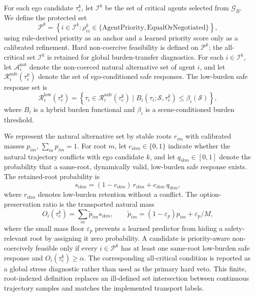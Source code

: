 \documentclass[10pt]{article}
\begin{document}
For each ego candidate $\tau^k_e$, let $\mathcal{I}^k$ be the set of critical agents selected from $\mathcal{G}_B$. We define the protected set
\begin{equation}
    \mathcal{P}^k
    =
    \left\{i\in\mathcal{I}^k:
    \rho^k_{ei}\in\{\mathrm{AgentPriority},\mathrm{EqualOrNegotiated}\}
    \right\},
    \label{eq:protected_set}
\end{equation}
using rule-derived priority as an anchor and a learned priority score only as a calibrated refinement. Hard non-coercive feasibility is defined on $\mathcal{P}^k$; the all-critical set $\mathcal{I}^k$ is retained for global burden-transfer diagnostics. For each $i\in\mathcal{I}^k$, let $\mathcal{A}^{\mathrm{nat}}_i$ denote the non-coerced natural alternative set of agent $i$, and let $\mathcal{R}^{\mathrm{safe}}_i(\tau^k_e)$ denote the set of ego-conditioned safe responses. The low-burden safe response set is
\begin{equation}
    \mathcal{R}^{\mathrm{low}}_i(\tau^k_e)
    =
    \left\{
    \tau_i \in \mathcal{R}^{\mathrm{safe}}_i(\tau^k_e)
    \mid
    B_i(\tau_i;\mathcal{S},\tau^k_e)
    \le
    \beta_i(\mathcal{S})
    \right\},
\end{equation}
where $B_i$ is a hybrid burden functional and $\beta_i$ is a scene-conditioned burden threshold.

We represent the natural alternative set by stable roots $r_{im}$ with calibrated masses $p_{im}$, $\sum_m p_{im}=1$. For root $m$, let $c_{ikm}\in\{0,1\}$ indicate whether the natural trajectory conflicts with ego candidate $k$, and let $q_{ikm}\in[0,1]$ denote the probability that a same-root, dynamically valid, low-burden safe response exists. The retained-root probability is
\begin{equation}
    s_{ikm}=(1-c_{ikm})\,r_{ikm}+c_{ikm}\,q_{ikm},
\end{equation}
where $r_{ikm}$ denotes low-burden retention without a conflict. The option-preservation ratio is the transported natural mass
\begin{equation}
    O_i(\tau^k_e)=\sum_m \widetilde p_{im}s_{ikm},
    \qquad
    \widetilde p_{im}=(1-\varepsilon_p)p_{im}+\varepsilon_p/M,
    \label{eq:option_preservation}
\end{equation}
where the small mass floor $\varepsilon_p$ prevents a learned predictor from hiding a safety-relevant root by assigning it zero probability. A candidate is priority-aware non-coercively feasible only if every $i\in\mathcal{P}^k$ has at least one same-root low-burden safe response and $O_i(\tau^k_e)\ge\alpha$. The corresponding all-critical condition is reported as a global stress diagnostic rather than used as the primary hard veto. This finite, root-indexed definition replaces an ill-defined set intersection between continuous trajectory samples and matches the implemented transport labels.
\end{document}

